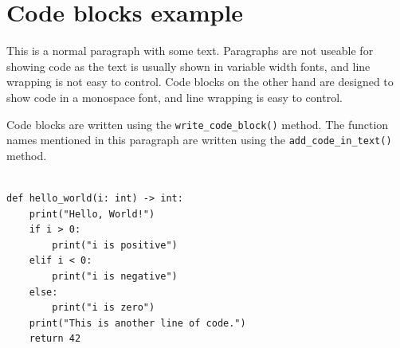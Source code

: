 \documentclass[a4paper]{report}
\begin{document}
\chapter{Code blocks example}

This is a normal paragraph with some text. Paragraphs are not useable for showing code as the text is usually shown in variable width fonts, and line wrapping is not easy to control. Code blocks on the other hand are designed to show code in a monospace font, and line wrapping is easy to control.

Code blocks are written using the \texttt{write\_code\_block()} method. The function names mentioned in this paragraph are written using the \texttt{add\_code\_in\_text()} method.

\begin{verbatim}

def hello_world(i: int) -> int:
    print("Hello, World!")
    if i > 0:
        print("i is positive")
    elif i < 0:
        print("i is negative")
    else:
        print("i is zero")
    print("This is another line of code.")
    return 42

\end{verbatim}
\end{document}
